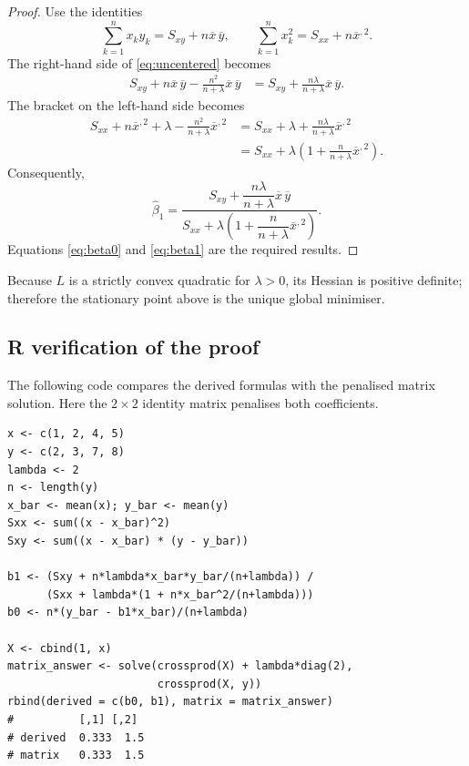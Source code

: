 ﻿\documentclass[11pt]{article}
\begin{document}
\begin{proof}
Use the identities
\[
\sum_{k=1}^n x_ky_k=S_{xy}+n\overline x\,\overline y,
\qquad
\sum_{k=1}^n x_k^2=S_{xx}+n\overline x^{,2}.
\]
The right-hand side of \eqref{eq:uncentered} becomes
\begin{align*}
S_{xy}+n\overline x\,\overline y
-\frac{n^2}{n+\lambda}\overline x\,\overline y
&=S_{xy}
+\frac{n\lambda}{n+\lambda}\overline x\,\overline y.
\end{align*}
The bracket on the left-hand side becomes
\begin{align*}
S_{xx}+n\overline x^{,2}+\lambda
-\frac{n^2}{n+\lambda}\overline x^{,2}
&=S_{xx}+\lambda
+\frac{n\lambda}{n+\lambda}\overline x^{,2}\\
&=S_{xx}
+\lambda\left(1+\frac{n}{n+\lambda}\overline x^{,2}\right).
\end{align*}
Consequently,
\begin{equation}
\boxed{
\widehat\beta_1=
\frac{
S_{xy}+\dfrac{n\lambda}{n+\lambda}\overline x\,\overline y
}{
S_{xx}+\lambda\left(1+\dfrac{n}{n+\lambda}\overline x^{,2}\right)
}.}
\label{eq:beta1}
\end{equation}
Equations \eqref{eq:beta0} and \eqref{eq:beta1} are the required results.
\end{proof}

Because $L$ is a strictly convex quadratic for $\lambda>0$, its Hessian is
positive definite; therefore the stationary point above is the unique global
minimiser.

\subsection*{R verification of the proof}

The following code compares the derived formulas with the penalised matrix
solution. Here the $2\times2$ identity matrix penalises both coefficients.

\begin{lstlisting}
x <- c(1, 2, 4, 5)
y <- c(2, 3, 7, 8)
lambda <- 2
n <- length(y)
x_bar <- mean(x); y_bar <- mean(y)
Sxx <- sum((x - x_bar)^2)
Sxy <- sum((x - x_bar) * (y - y_bar))

b1 <- (Sxy + n*lambda*x_bar*y_bar/(n+lambda)) /
      (Sxx + lambda*(1 + n*x_bar^2/(n+lambda)))
b0 <- n*(y_bar - b1*x_bar)/(n+lambda)

X <- cbind(1, x)
matrix_answer <- solve(crossprod(X) + lambda*diag(2),
                       crossprod(X, y))
rbind(derived = c(b0, b1), matrix = matrix_answer)
#          [,1] [,2]
# derived  0.333  1.5
# matrix   0.333  1.5
\end{lstlisting}
\end{document}
